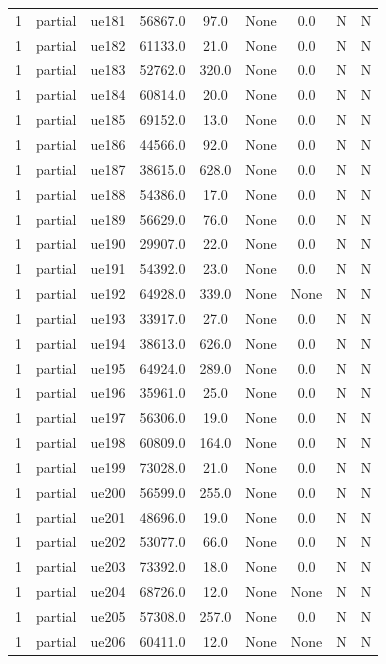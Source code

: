 \begin{table}[ht]
\begin{tabular}{|c|c|c|c|c|c|c|c|c|}
1 & partial & ue181 & 56867.0 & 97.0 & None & 0.0 & N & N \\
1 & partial & ue182 & 61133.0 & 21.0 & None & 0.0 & N & N \\
1 & partial & ue183 & 52762.0 & 320.0 & None & 0.0 & N & N \\
1 & partial & ue184 & 60814.0 & 20.0 & None & 0.0 & N & N \\
1 & partial & ue185 & 69152.0 & 13.0 & None & 0.0 & N & N \\
1 & partial & ue186 & 44566.0 & 92.0 & None & 0.0 & N & N \\
1 & partial & ue187 & 38615.0 & 628.0 & None & 0.0 & N & N \\
1 & partial & ue188 & 54386.0 & 17.0 & None & 0.0 & N & N \\
1 & partial & ue189 & 56629.0 & 76.0 & None & 0.0 & N & N \\
1 & partial & ue190 & 29907.0 & 22.0 & None & 0.0 & N & N \\
1 & partial & ue191 & 54392.0 & 23.0 & None & 0.0 & N & N \\
1 & partial & ue192 & 64928.0 & 339.0 & None & None & N & N \\
1 & partial & ue193 & 33917.0 & 27.0 & None & 0.0 & N & N \\
1 & partial & ue194 & 38613.0 & 626.0 & None & 0.0 & N & N \\
1 & partial & ue195 & 64924.0 & 289.0 & None & 0.0 & N & N \\
1 & partial & ue196 & 35961.0 & 25.0 & None & 0.0 & N & N \\
1 & partial & ue197 & 56306.0 & 19.0 & None & 0.0 & N & N \\
1 & partial & ue198 & 60809.0 & 164.0 & None & 0.0 & N & N \\
1 & partial & ue199 & 73028.0 & 21.0 & None & 0.0 & N & N \\
1 & partial & ue200 & 56599.0 & 255.0 & None & 0.0 & N & N \\
1 & partial & ue201 & 48696.0 & 19.0 & None & 0.0 & N & N \\
1 & partial & ue202 & 53077.0 & 66.0 & None & 0.0 & N & N \\
1 & partial & ue203 & 73392.0 & 18.0 & None & 0.0 & N & N \\
1 & partial & ue204 & 68726.0 & 12.0 & None & None & N & N \\
1 & partial & ue205 & 57308.0 & 257.0 & None & 0.0 & N & N \\
1 & partial & ue206 & 60411.0 & 12.0 & None & None & N & N \\

\end{tabular}
\end{table}

